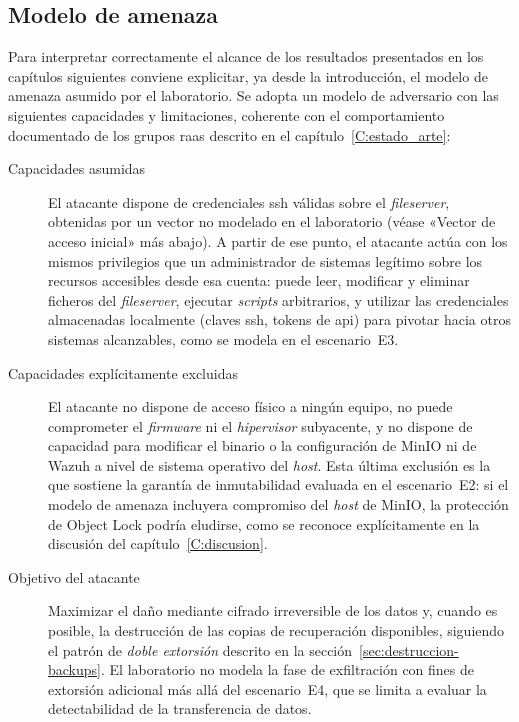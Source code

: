 \documentclass[../main.tex]{subfiles}
\begin{document}
\subsection{Modelo de amenaza}
\label{sec:modelo-amenaza}

Para interpretar correctamente el alcance de los resultados presentados en los
capítulos siguientes conviene explicitar, ya desde la introducción, el modelo de
amenaza asumido por el laboratorio. Se adopta un modelo de adversario con las
siguientes capacidades y limitaciones, coherente con el comportamiento
documentado de los grupos \gls{raas} descrito en el
capítulo~\ref{C:estado_arte}:

\begin{description}
  \item[Capacidades asumidas] El atacante dispone de credenciales \gls{ssh}
  válidas sobre el \emph{fileserver}, obtenidas por un vector no modelado en el
  laboratorio (véase «Vector de acceso inicial» más abajo). A partir de ese punto,
  el atacante actúa con los mismos privilegios que un administrador de sistemas
  legítimo sobre los recursos accesibles desde esa cuenta: puede leer, modificar
  y eliminar ficheros del \emph{fileserver}, ejecutar \emph{scripts} arbitrarios,
  y utilizar las credenciales almacenadas localmente (claves \gls{ssh}, tokens de
  \gls{api}) para pivotar hacia otros sistemas alcanzables, como se modela en el
  escenario~E3.

  \item[Capacidades explícitamente excluidas] El atacante no dispone de acceso
  físico a ningún equipo, no puede comprometer el \emph{firmware} ni el
  \emph{hipervisor} subyacente, y no dispone de capacidad para modificar el
  binario o la configuración de MinIO ni de Wazuh a nivel de sistema operativo del
  \emph{host}. Esta última exclusión es la que sostiene la garantía de
  inmutabilidad evaluada en el escenario~E2: si el modelo de amenaza incluyera
  compromiso del \emph{host} de MinIO, la protección de Object Lock podría
  eludirse, como se reconoce explícitamente en la discusión del
  capítulo~\ref{C:discusion}.

  \item[Objetivo del atacante] Maximizar el daño mediante cifrado irreversible de
  los datos y, cuando es posible, la destrucción de las copias de recuperación
  disponibles, siguiendo el patrón de \emph{doble extorsión} descrito en la
  sección~\ref{sec:destruccion-backups}. El laboratorio no modela la fase de
  exfiltración con fines de extorsión adicional más allá del escenario~E4, que se
  limita a evaluar la detectabilidad de la transferencia de datos.


\end{description}
\end{document}
